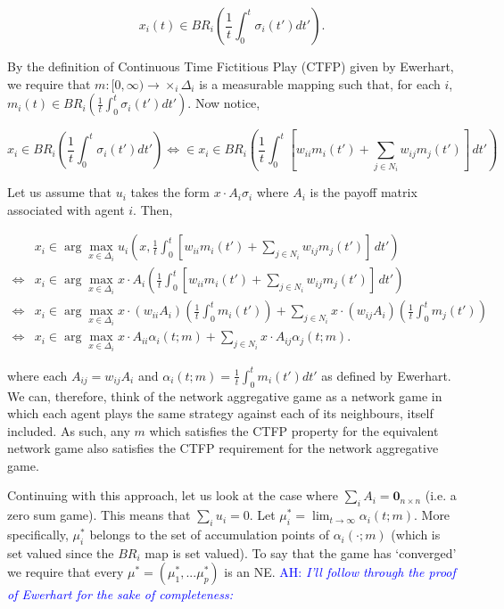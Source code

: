 \documentclass{article}
\theoremstyle{definition}
\newcommand{\ah}[1]{\textcolor{blue}{AH: \textit{#1}}}
\begin{document}
	\newpage

	\begin{equation}
		x_i(t) \in BR_i \left( \frac{1}{t} \int_{0}^{t} \sigma_i(t') dt' \right).
	\end{equation}
	
	By the definition of Continuous Time Fictitious Play (CTFP) given by Ewerhart, we require that $m: [0, \infty) \rightarrow \times_i \Delta_i$ is a measurable mapping such that, for each $i$, $m_i(t) \in BR_i \left( \frac{1}{t} \int_{0}^{t} \sigma_i(t') dt' \right)$. Now notice,
	
	\begin{equation*}
		x_i \in BR_i \left( \frac{1}{t} \int_{0}^{t} \sigma_i(t') dt' \right) \iff  \in x_i\in BR_i \left( \frac{1}{t} \int_{0}^{t} [w_{ii} m_i(t') + \sum_{j \in N_i} w_{ij} m_j(t')] \, dt' \right)
	\end{equation*}
	
	Let us assume that $u_i$ takes the form $x \cdot A_i \sigma_i$ where $A_i$ is the payoff matrix associated with agent $i$. Then,
	
	\begin{align}
		& x_i \in \arg\max_{x \in \Delta_i} u_i(x,\frac{1}{t} \int_{0}^{t} [w_{ii} m_i(t') + \sum_{j \in N_i} w_{ij} m_j(t')] \, dt') \nonumber \\
		\iff & x_i \in \arg\max_{x \in \Delta_i} x \cdot A_i \left(\frac{1}{t} \int_{0}^{t} [w_{ii} m_i(t') + \sum_{j \in N_i} w_{ij} m_j(t')] \, dt' \right) \nonumber \\
		\iff & x_i \in \arg \max_{x \in \Delta_i} x \cdot (w_{ii} A_i) \left( \frac{1}{t} \int_{0}^{t} m_i(t')\right) + \sum_{j \in N_i} x \cdot (w_{ij} A_i) \left( \frac{1}{t} \int_{0}^{t} m_j(t')\right) \nonumber \\
		\iff & x_i \in \arg \max_{x \in \Delta_i} x \cdot A_{ii} \alpha_i(t; m) + \sum_{j \in N_i} x \cdot A_{ij} \alpha_j(t; m).
	\end{align}
	
	where each $A_{ij} = w_{ij} A_i$ and $\alpha_i(t; m) =\frac{1}{t} \int_{0}^{t} m_i(t') dt'$ as defined by Ewerhart. We can, therefore, think of the network aggregative game as a network game in which each agent plays the same strategy against each of its neighbours, itself included. As such, any $m$ which satisfies the CTFP property for the equivalent network game also satisfies the CTFP requirement for the network aggregative game. 
	
	Continuing with this approach, let us look at the case where $\sum_i A_i = \textbf{0}_{n\times n}$ (i.e. a zero sum game). This means that $\sum_i u_i = 0$. Let $\mu_i^* = \lim_{t \rightarrow \infty} \alpha_i(t; m)$. More specifically, $\mu_i^*$ belongs to the set of accumulation points of $\alpha_i(\cdot; m)$ (which is set valued since the $BR_i$ map is set valued). To say that the game has `converged' we require that every $\mu^* = (\mu_1^*, ... \mu_p^*)$ is an NE. \ah{I'll follow through the proof of Ewerhart for the sake of completeness: }
	
\end{document}
